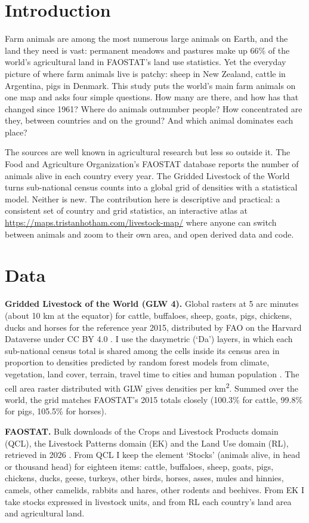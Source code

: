 \documentclass[11pt,a4paper]{article}
\begin{document}
\section{Introduction}
Farm animals are among the most numerous large animals on Earth, and the land they need is vast: permanent meadows and pastures make up 66\% of the world's agricultural land in FAOSTAT's land use statistics. Yet the everyday picture of where farm animals live is patchy: sheep in New Zealand, cattle in Argentina, pigs in Denmark. This study puts the world's main farm animals on one map and asks four simple questions. How many are there, and how has that changed since 1961? Where do animals outnumber people? How concentrated are they, between countries and on the ground? And which animal dominates each place?

The sources are well known in agricultural research but less so outside it. The Food and Agriculture Organization's FAOSTAT database \citep{faostat} reports the number of animals alive in each country every year. The Gridded Livestock of the World \citep{gilbert2018,nicolas2016,robinson2014} turns sub-national census counts into a global grid of densities with a statistical model. Neither is new. The contribution here is descriptive and practical: a consistent set of country and grid statistics, an interactive atlas at \url{https://maps.tristanhotham.com/livestock-map/} where anyone can switch between animals and zoom to their own area, and open derived data and code.

\section{Data}
\textbf{Gridded Livestock of the World (GLW 4).} Global rasters at 5 arc minutes (about 10 km at the equator) for cattle, buffaloes, sheep, goats, pigs, chickens, ducks and horses for the reference year 2015, distributed by FAO on the Harvard Dataverse under CC BY 4.0 \citep{glw4}. I use the dasymetric (`Da') layers, in which each sub-national census total is shared among the cells inside its census area in proportion to densities predicted by random forest models from climate, vegetation, land cover, terrain, travel time to cities and human population \citep{nicolas2016,gilbert2018}. The cell area raster distributed with GLW gives densities per km\textsuperscript{2}. Summed over the world, the grid matches FAOSTAT's 2015 totals closely (100.3\% for cattle, 99.8\% for pigs, 105.5\% for horses).

\textbf{FAOSTAT.} Bulk downloads of the Crops and Livestock Products domain (QCL), the Livestock Patterns domain (EK) and the Land Use domain (RL), retrieved in 2026 \citep{faostat}. From QCL I keep the element `Stocks' (animals alive, in head or thousand head) for eighteen items: cattle, buffaloes, sheep, goats, pigs, chickens, ducks, geese, turkeys, other birds, horses, asses, mules and hinnies, camels, other camelids, rabbits and hares, other rodents and beehives. From EK I take stocks expressed in livestock units, and from RL each country's land area and agricultural land.
\end{document}

